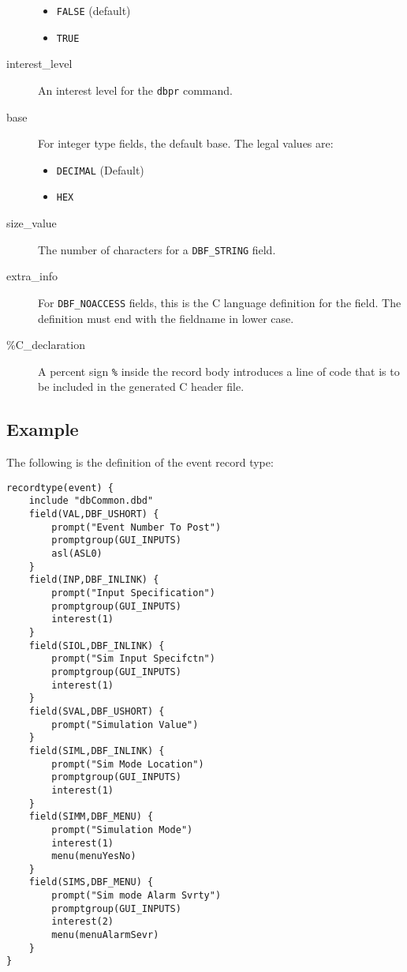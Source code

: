 \begin{description}
\begin{itemize}
\item \verb|FALSE| (default)
\item \verb|TRUE|
\end{itemize}

\item [interest\_level] An interest level for the \verb|dbpr| command.

\item [base] For integer type fields, the default base.
The legal values are:

\begin{itemize}
\item \verb|DECIMAL| (Default)
\item \verb|HEX|
\end{itemize}

\item [size\_value] The number of characters for a \verb|DBF_STRING| field.

\item [extra\_info] For \verb|DBF_NOACCESS| fields, this is the C language definition for the field.
The definition must end with the fieldname in lower case.

\item [\%C\_declaration] A percent sign \verb|%| inside the record body introduces a line of code that is to be included in the generated C header file.
\end{description}

\subsection{Example}

The following is the definition of the event record type:

\begin{verbatim}
recordtype(event) {
    include "dbCommon.dbd" 
    field(VAL,DBF_USHORT) {
        prompt("Event Number To Post")
        promptgroup(GUI_INPUTS)
        asl(ASL0)
    }
    field(INP,DBF_INLINK) {
        prompt("Input Specification")
        promptgroup(GUI_INPUTS)
        interest(1)
    }
    field(SIOL,DBF_INLINK) {
        prompt("Sim Input Specifctn")
        promptgroup(GUI_INPUTS)
        interest(1)
    }
    field(SVAL,DBF_USHORT) {
        prompt("Simulation Value")
    }
    field(SIML,DBF_INLINK) {
        prompt("Sim Mode Location")
        promptgroup(GUI_INPUTS)
        interest(1)
    }
    field(SIMM,DBF_MENU) {
        prompt("Simulation Mode")
        interest(1)
        menu(menuYesNo)
    }
    field(SIMS,DBF_MENU) {
        prompt("Sim mode Alarm Svrty")
        promptgroup(GUI_INPUTS)
        interest(2)
        menu(menuAlarmSevr)
    }
}
\end{verbatim}

